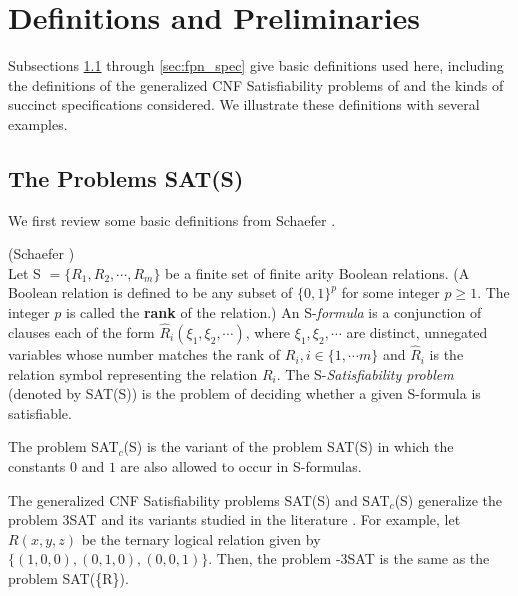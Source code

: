 \section{Definitions and Preliminaries}\label{sec:def}

Subsections  \ref{sec:other_def} through \ref{sec:fpn_spec} give
basic definitions used here, including the definitions of the
generalized {\sf CNF} Satisfiability problems  of \cite{Sc78} and
the kinds of succinct specifications considered. We illustrate these
definitions with several examples.


\subsection{The Problems {\sf SAT(S)}}\label{sec:other_def}

We first review some basic definitions  from Schaefer \cite{Sc78}.

\begin{definition}\label{s-formulas:def}(Schaefer \cite{Sc78})\\
Let S $= \{R_1,R_2, \cdots, R_m \}$ be a finite 
set of finite arity Boolean
relations. (A Boolean relation is defined to be 
any subset of $\{0,1 \}^p$ for some integer $p \geq 1$. 
The integer $p$ is called the  {\bf rank} of the relation.)
An S-{\it formula} is a conjunction of clauses each of the form 
$\hat{R}_i(\xi_1, \xi_2, \cdots)$, where $\xi_1, \xi_2, \cdots$ are distinct, 
unnegated variables whose number matches the 
rank of $R_i, i \in \{ 1, \cdots m \}$ and $\hat{R}_i$ is the relation symbol
representing the relation $R_i$.
The  S-{\it Satisfiability problem} (denoted by SAT(S)) 
is the problem of deciding 
whether a given S-formula is satisfiable.

The problem {\sf SAT$_c$(S)} is the variant of the problem 
{\sf SAT(S)} in which the constants $0$ and $1$ are also allowed
to occur in {\sf S-}formulas. 
\end{definition}


The 
generalized {\sf CNF} Satisfiability problems {\sf SAT(S)} and 
{\sf SAT$_c$(S)} generalize  the problem  {\sf 3SAT} and its variants
studied in the literature \cite{GJ79}. For example,
let $R(x,y,z)$ be the ternary logical relation  given by
$\{(1,0,0), (0,1,0), (0,0,1) \}$. Then, the problem 
{-3SAT}  is the same as the problem {\sf SAT(\{R\})}. 

\iffalse
Similarly, {\sf NAE3SAT} is the problem of determining if
a {\sf 3CNF} formula, has a satisfying assignment in which all the literals
in any clause are not simultaneously true. 
\fi



